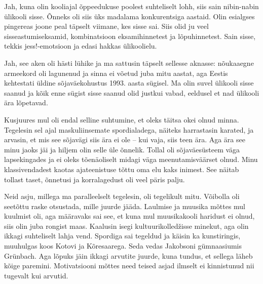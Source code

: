 
Jah, kuna olin kooliajal õppeedukuse
poolest suhteliselt lohh, siis sain nibin-nabin ülikooli sisse. 
Õnneks oli siis üks madalama konkurentsiga aastaid. Olin esialgses pingereas joone peal täpselt viimane, kes sisse sai. 
Siis olid ju veel sisseastumiseksamid, kombinatsioon 
eksamihinnetest ja lõpuhinnetest. Sain sisse, tekkis jess!-emotsioon ja edasi hakkas ülikoolielu. 


Jah, see aken oli hästi lühike ja ma sattusin täpselt sellesse aknasse: 
nõukaaegne armeekord oli 
lagunenud ja sinna ei võetud juba mitu aastat, aga Eestis kehtestati üldine 
sõjaväekohustus 1993. aasta sügisel. Ma olin suvel ülikooli sisse 
saanud ja kõik enne sügist sisse saanud olid justkui vabad, eeldusel et nad ülikooli ära lõpetavad. 


Kusjuures mul oli endal selline suhtumine, et 
oleks täitsa okei olnud minna. Tegelesin sel ajal maskuliinsemate spordialadega, näiteks harrastasin karated, ja 
arvasin, et mis see sõjavägi siis ära ei ole -- kui vaja, siis 
teen ära. Aga ära see minu jaoks jäi ja hiljem olin selle üle õnnelik. 
Tollal oli sõjaväesüsteem 
väga lapsekingades ja ei oleks tõenäoliselt midagi 
väga meenutamisväärset olnud. Minu 
klassivendadest kaotas ajateenistuse tõttu oma elu kaks inimest. See 
näitab tollast taset, õnnetusi ja korralagedust oli veel päris palju. 


Neid asju, millega ma paralleelselt tegelesin, oli tegelikult mitu. Võibolla oli seetõttu raske otsustada, mille juurde jääda. 
Laulmise ja muusika mõttes mul kuulmist oli, aga määravaks sai see, et 
kuna mul muusikakooli haridust ei olnud, siis olin juba 
rongist maas. Kaalusin isegi 
kultuurikolledžisse minekut, aga olin ikkagi suhteliselt lahja 
vend. Spordiga sai tegeldud ja käisin ka kunstiringis, muuhulgas koos 
Kotovi ja Kõresaarega. Seda vedas Jakobsoni gümnaasiumis Grünbach. Aga
lõpuks jäin ikkagi arvutite juurde, kuna tundus, et sellega läheb kõige paremini. Motivatsiooni mõttes need teised asjad 
ilmselt ei kinnistunud nii tugevalt kui arvutid. 

